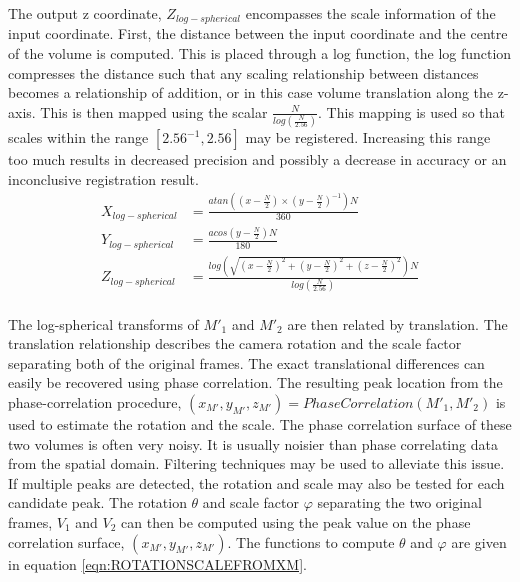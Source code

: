 The output z coordinate, $Z_{log-spherical}$ encompasses the scale information of the input coordinate. First, the distance between the input coordinate and the centre of the volume is computed. This is placed through a log function, the log function compresses the distance such that any scaling relationship between distances becomes a relationship of addition, or in this case volume translation along the z-axis. This is then mapped using the scalar $\frac{N}{log\left(\frac{N}{2.56}\right)}$. This mapping is used so that scales within the range $[2.56^{-1}, 2.56]$ may be registered. Increasing this range too much results in decreased precision and possibly a decrease in accuracy or an inconclusive registration result. \\


\begin{equation} \label{eqn:Log_Spherical}
\begin{split}
X_{log-spherical} & = \frac{atan\left(
\left( x-\frac{N}{2} \right) \times
\left(y-\frac{N}{2}\right)^{-1}
\right)N}{360}\\
Y_{log-spherical} & = \frac{acos\left(
y-\frac{N}{2}
\right)N}
{180} \\
Z_{log-spherical} & =\frac{log\left(
\sqrt{\left(x-\frac{N}{2}\right)^2+\left(y-\frac{N}{2}\right)^2+\left(z-\frac{N}{2}\right)^2}
\right)N}{log\left( \frac{N}{2.56} \right)} \\
\end{split}
\end{equation}

The log-spherical transforms of $M'_1$ and $M'_2$ are then related by translation. The translation relationship describes the camera rotation and the scale factor separating both of the original frames. The exact translational differences can easily be recovered using phase correlation. The resulting peak location from the phase-correlation procedure, $(x_{M'},y_{M'},z_{M'}) = PhaseCorrelation(M'_1, M'_2)$ is used to estimate the rotation and the scale. The phase correlation surface of these two volumes is often very noisy. It is usually noisier than phase correlating data from the spatial domain. Filtering techniques may be used to alleviate this issue. If multiple peaks are detected, the rotation and scale may also be tested for each candidate peak. The rotation $\theta$ and scale factor $\varphi$ separating the two original frames, $V_1$ and $V_2$ can then be computed using the peak value on the phase correlation surface, $(x_{M'},y_{M'},z_{M'})$. The functions to compute $\theta$ and $\varphi$ are given in equation \ref{eqn:ROTATIONSCALEFROMXM}. \\
 

